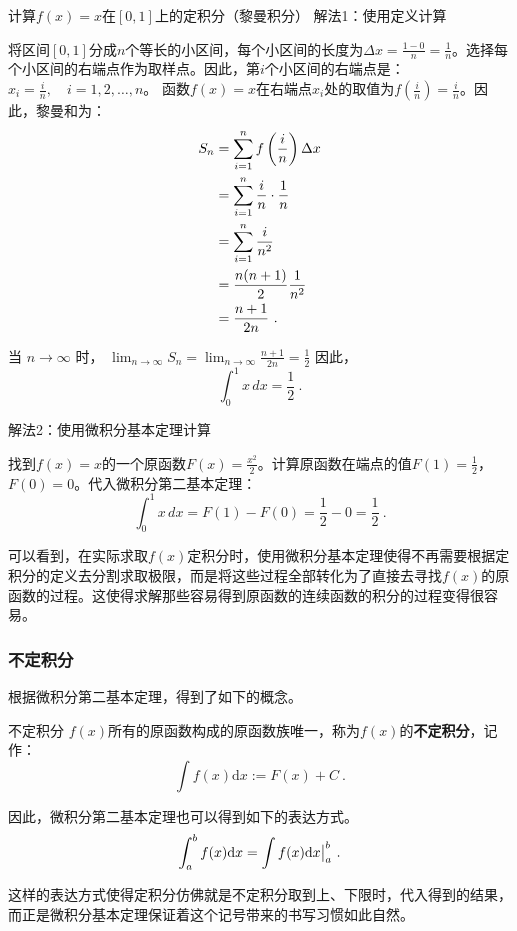 \begin{example}{计算$f(x)=x$在$[0,1]$上的定积分（黎曼积分）}
解法1：使用定义计算

将区间$[0, 1]$分成$n$个等长的小区间，每个小区间的长度为$\Delta x = \frac{1 - 0}{n} = \frac{1}{n}$。选择每个小区间的右端点作为取样点。因此，第$i$个小区间的右端点是：$x_i = \frac{i}{n}, \quad i = 1, 2, \ldots, n$。
函数$f(x) = x$在右端点$x_i$处的取值为$f\left(\frac{i}{n} \right)=\frac{i}{n}$。因此，黎曼和为：
$$\begin{align*}
S_n &= \sum_{i=1}^n f\left( \frac{i}{n} \right) \Delta x \\
&= \sum_{i=1}^n \frac{i}{n} \cdot \frac{1}{n} \\
&=\sum_{i=1}^n \frac{i}{n^2}\\
&=\frac{n(n+1)}{2}{1\over n^2} \\
&= \frac{n+1}{2n}~.
\end{align*}$$


当 $ n \to \infty $ 时，
$\lim_{n \to \infty} S_n = \lim_{n \to \infty} \frac{n+1}{2n}= \frac{1}{2}$
因此，
$$\int_0^1 x \, dx = \frac{1}{2}~.$$


解法2：使用微积分基本定理计算

找到$f(x) = x$的一个原函数$F(x)=\frac{x^2}{2}$。计算原函数在端点的值$F(1) =\frac{1}{2}$，$F(0) = 0$。代入微积分第二基本定理：
$$\int_0^1 x \, dx = F(1) - F(0) = \frac{1}{2} - 0 = \frac{1}{2}~.$$


\end{example}
可以看到，在实际求取$f(x)$定积分时，使用微积分基本定理使得不再需要根据定积分的定义去分割求取极限，而是将这些过程全部转化为了直接去寻找$f(x)$的原函数的过程。这使得求解那些容易得到原函数的连续函数的积分的过程变得很容易。

\subsubsection{不定积分}

根据微积分第二基本定理，得到了如下的概念。

\begin{definition}{不定积分}
$f(x)$所有的原函数构成的原函数族唯一，称为$f(x)$的\textbf{不定积分}，记作：
\begin{equation}
\int f(x)\mathrm {d}x:=F(x)+C~.
\end{equation}

\end{definition}

因此，微积分第二基本定理也可以得到如下的表达方式。
\begin{equation}
\int_{a}^{b} f(x)\mathrm {d}x=\int f(x)\mathrm {d}x\big{|}_{a}^{b}~.
\end{equation}

这样的表达方式使得定积分仿佛就是不定积分取到上、下限时，代入得到的结果，而正是微积分基本定理保证着这个记号带来的书写习惯如此自然。